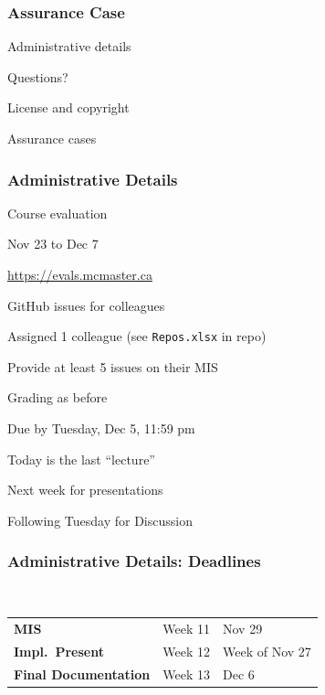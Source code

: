 \documentclass[t,12pt,numbers,fleqn]{beamer}
\begin{document}



\begin{frame}
\frametitle{Assurance Case}

\bi
\item Administrative details
\item Questions?
\item License and copyright
\item Assurance cases
\ei
\end{frame}


\begin{frame}
\frametitle{Administrative Details}

\bi
\item Course evaluation
\bi
\item Nov 23 to Dec 7
\item \url{https://evals.mcmaster.ca}
\ei
\item GitHub issues for colleagues
\bi
\item Assigned 1 colleague (see \texttt{Repos.xlsx} in repo)
\item Provide at least 5 issues on their MIS
\item Grading as before
\item Due by Tuesday, Dec 5, 11:59 pm
\ei
\item Today is the last ``lecture''
\item Next week for presentations
\item Following Tuesday for Discussion
\ei

\end{frame}


\begin{frame}
\frametitle{Administrative Details: Deadlines}
~\newline
\begin{tabular}{l l l}
\textbf{MIS} & Week 11 & Nov 29\\
\textbf{Impl.\ Present} & Week 12 & Week of Nov 27\\
\textbf{Final Documentation} & Week 13 & Dec 6\\
\end {tabular}

\end{frame}
\end{document}

